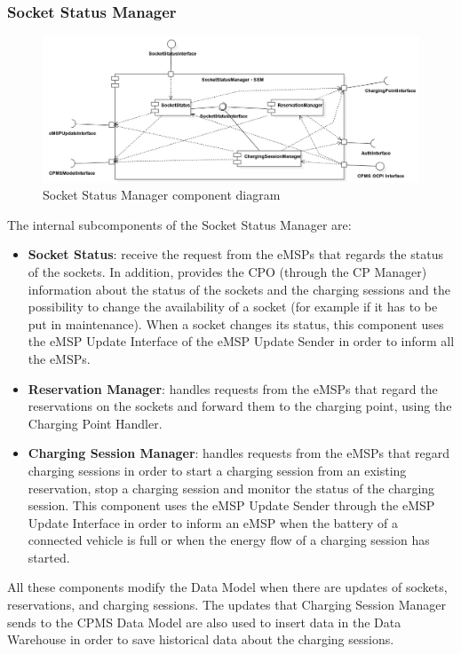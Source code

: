 \documentclass{Configuration_Files/PoliMi3i_thesis}
\begin{document}
\subsubsection{Socket Status Manager}

\begin{figure}[H]
    \centering
    \includegraphics[width=1\textwidth]{Images/component/SocketStatusManager.jpg}
    \caption{Socket Status Manager component diagram}
\end{figure}

The internal subcomponents of the Socket Status Manager are:
\begin{itemize}
    \item \textbf{Socket Status}: receive the request from the eMSPs that regards the status of the sockets. In addition, provides the CPO (through the CP Manager) information about the status of the sockets and the charging sessions and the possibility to change the availability of a socket (for example if it has to be put in maintenance). When a socket changes its status, this component uses the eMSP Update Interface of the eMSP Update Sender in order to inform all the eMSPs.
    \item \textbf{Reservation Manager}: handles requests from the eMSPs that regard the reservations on the sockets and forward them to the charging point, using the Charging Point Handler.
    \item \textbf{Charging Session Manager}: handles requests from the eMSPs that regard charging sessions in order to start a charging session from an existing reservation, stop a charging session and monitor the status of the charging session. This component uses the eMSP Update Sender through the eMSP Update Interface in order to inform an eMSP when the battery of a connected vehicle is full or when the energy flow of a charging session has started.
\end{itemize}
All these components modify the Data Model when there are updates of sockets, reservations, and charging sessions. The updates that Charging Session Manager sends to the CPMS Data Model are also used to insert data in the Data Warehouse in order to save historical data about the charging sessions.
\end{document}
